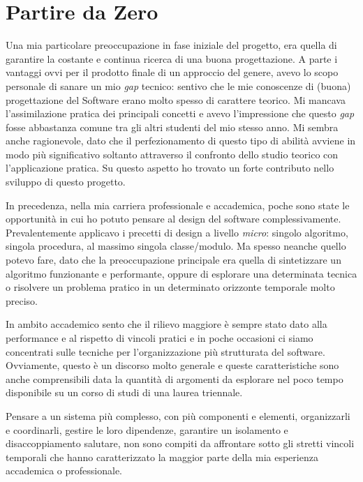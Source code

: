 \documentclass[12pt]{report}
\begin{document}
\section{Partire da Zero}

Una mia particolare preoccupazione in fase iniziale del progetto, era
quella di garantire la costante e continua ricerca di una buona
progettazione. A parte i vantaggi ovvi per il prodotto finale di un
approccio del genere, avevo lo scopo personale di sanare un mio
\textit{gap} tecnico: sentivo che le mie conoscenze di (buona)
progettazione del Software erano molto spesso di carattere teorico. 
Mi mancava l'assimilazione pratica dei principali concetti e avevo
l'impressione che questo \textit{gap} fosse abbastanza comune tra gli altri
studenti del mio stesso anno. Mi sembra anche ragionevole, dato che il
perfezionamento di questo tipo di abilità avviene in modo più
significativo soltanto attraverso il confronto dello studio teorico con
l'applicazione pratica. Su questo aspetto ho trovato un forte contributo nello
sviluppo di questo progetto.

In precedenza, nella mia carriera professionale e accademica, poche
sono state le opportunità in cui ho potuto pensare al design del
software complessivamente. Prevalentemente applicavo i precetti 
di design a livello \textit{micro}: singolo algoritmo,
singola procedura, al massimo singola classe/modulo. Ma spesso
neanche quello potevo fare, dato che la preoccupazione principale era
quella di sintetizzare un algoritmo funzionante e performante, oppure
di esplorare una determinata tecnica o risolvere un problema pratico in un
determinato orizzonte temporale molto preciso.

In ambito accademico sento che il rilievo maggiore è sempre stato 
dato alla performance e al rispetto di vincoli pratici e in poche
occasioni ci siamo concentrati sulle tecniche per l'organizzazione
più strutturata del software. Ovviamente, questo è un discorso
molto generale e queste caratteristiche sono anche comprensibili data
la quantità di argomenti da esplorare nel poco tempo disponibile
su un corso di studi di una laurea triennale.

Pensare a un sistema più complesso, con più componenti e elementi, 
organizzarli e coordinarli, gestire le loro
dipendenze, garantire un isolamento e disaccoppiamento salutare, non sono
compiti da affrontare sotto gli stretti vincoli temporali che hanno 
caratterizzato la maggior parte della mia esperienza accademica o professionale. 
\end{document}
